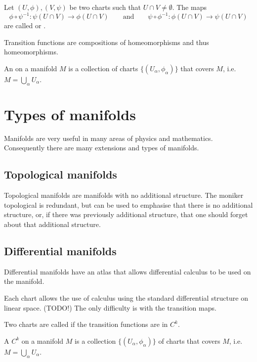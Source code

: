 \begin{definition}
Let $(U,\phi), (V,\psi)$ be two charts such that $U\cap V \neq \emptyset$. The maps
\[ \phi\circ\psi^{-1}:\psi(U\cap V)\to \phi(U\cap V) \qquad \text{and} \qquad \psi\circ\phi^{-1}:\phi(U\cap V)\to \psi(U\cap V) \]
are called  or .
\end{definition}
Transition functions are compositions of homeomorphisms and thus homeomorphisms.

\begin{definition}
An  on a manifold $M$ is a collection of charts $\{(U_\alpha, \phi_\alpha)\}$ that covers $M$, i.e. $M=\bigcup_\alpha U_\alpha$.
\end{definition}

\section{Types of manifolds}
Manifolds are very useful in many areas of physics and mathematics. Consequently there are many extensions and types of manifolds.
\subsection{Topological manifolds}
Topological manifolds are manifolds with no additional structure. The moniker topological is redundant, but can be used to emphasise that there is no additional structure, or, if there was previously additional structure, that one should forget about that additional structure.
\subsection{Differential manifolds} 
Differential manifolds have an atlas that allows differential calculus to be used on the manifold.

Each chart allows the use of calculus using the standard differential structure on linear space. (TODO!) The only difficulty is with the transition maps.
\begin{definition}
Two charts are called  if the transition functions are in $C^k$.
\end{definition}

\begin{definition}
A $C^k$  on a manifold $M$ is a collection  $\{(U_\alpha, \phi_\alpha)\}$ of  charts that covers $M$, i.e. $M=\bigcup_\alpha U_\alpha$.
\end{definition}

